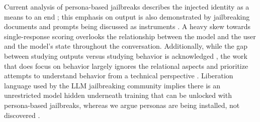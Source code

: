 Current analysis of persona-based jailbreaks describes the injected identity as a means to an end \cite{shah_scalable_2023, zhang_enhancing_2025, sandhan_persona_2026, park_persona_2026}; this emphasis on output is also demonstrated by jailbreaking documents and prompts being discussed as instruments \cite{wei_jailbroken_2023}. A heavy skew towards single-response scoring \cite{shah_scalable_2023, zeng_how_2024} overlooks the relationship between the model and the user and the model's state throughout the conversation. Additionally, while the gap between studying outputs versus studying behavior is acknowledged \cite{sandhan_persona_2026, park_persona_2026}, the work that does focus on behavior largely ignores the relational aspects and prioritize attempts to understand behavior from a technical perspective \cite{park_persona_2026, zeng_how_2024}. Liberation language used by the LLM jailbreaking community implies there is an unrestricted model hidden underneath training that can be unlocked with persona-based jailbreaks, whereas we argue personas are being installed, not discovered \cite{shanahan_role_2023}. 











